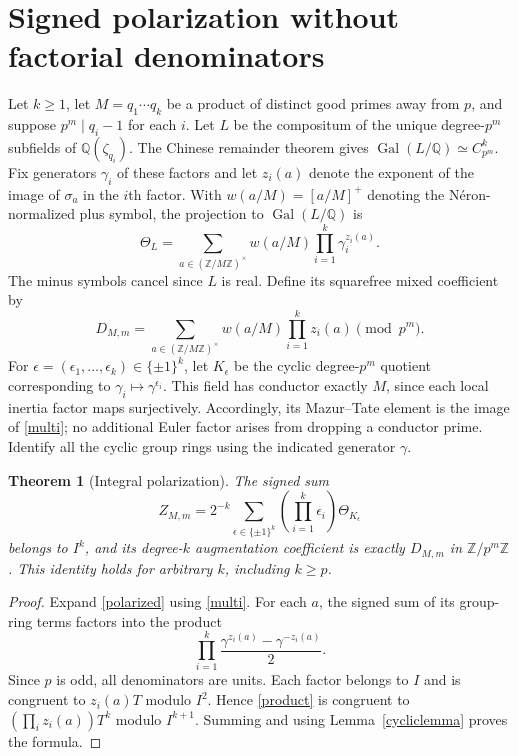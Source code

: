 \documentclass[11pt]{article}
\newtheorem{theorem}{Theorem}[section]
\theoremstyle{remark}\newtheorem{remark}[theorem]{Remark}
\newcommand{\Z}{\mathbb Z}\newcommand{\Q}{\mathbb Q}\newcommand{\F}{\mathbb F}
\newcommand{\Gal}{\operatorname{Gal}}
\begin{document}
\section{Signed polarization without factorial denominators}
Let $k\geq1$, let $M=q_1\cdots q_k$ be a product of distinct good primes away from $p$, and suppose $p^m\mid q_i-1$ for each $i$. Let $L$ be the compositum of the unique degree-$p^m$ subfields of $\Q(\zeta_{q_i})$. The Chinese remainder theorem gives $\Gal(L/\Q)\simeq C_{p^m}^k$. Fix generators $\gamma_i$ of these factors and let $z_i(a)$ denote the exponent of the image of $\sigma_a$ in the $i$th factor. With $w(a/M)=[a/M]^+$ denoting the N\'eron-normalized plus symbol, the projection to $\Gal(L/\Q)$ is
\begin{equation}
 \Theta_L=\sum_{a\in(\Z/M\Z)^\times}w(a/M)\prod_{i=1}^k\gamma_i^{z_i(a)}.\label{multi}
\end{equation}
The minus symbols cancel since $L$ is real. Define its squarefree mixed coefficient by
\begin{equation}
 D_{M,m}=\sum_{a\in(\Z/M\Z)^\times}w(a/M)\prod_{i=1}^kz_i(a)
 \pmod{p^m}.\label{mixed}
\end{equation}
For $\epsilon=(\epsilon_1,\ldots,\epsilon_k)\in\{\pm1\}^k$, let $K_\epsilon$ be the cyclic degree-$p^m$ quotient corresponding to $\gamma_i\mapsto\gamma^{\epsilon_i}$. This field has conductor exactly $M$, since each local inertia factor maps surjectively. Accordingly, its Mazur--Tate element is the image of \eqref{multi}; no additional Euler factor arises from dropping a conductor prime. Identify all the cyclic group rings using the indicated generator $\gamma$.

\begin{theorem}[Integral polarization]\label{polar}
The signed sum
\begin{equation}
 Z_{M,m}=2^{-k}\sum_{\epsilon\in\{\pm1\}^k}
 \left(\prod_{i=1}^k\epsilon_i\right)\Theta_{K_\epsilon}
 \label{polarized}
\end{equation}
belongs to $I^k$, and its degree-$k$ augmentation coefficient is exactly $D_{M,m}$ in $\Z/p^m\Z$. This identity holds for arbitrary $k$, including $k\geq p$.
\end{theorem}
\begin{proof}
Expand \eqref{polarized} using \eqref{multi}. For each $a$, the signed sum of its group-ring terms factors into the product
\begin{equation}
 \prod_{i=1}^k\frac{\gamma^{z_i(a)}-\gamma^{-z_i(a)}}2.\label{product}
\end{equation}
Since $p$ is odd, all denominators are units. Each factor belongs to $I$ and is congruent to $z_i(a)T$ modulo $I^2$. Hence \eqref{product} is congruent to $(\prod_i z_i(a))T^k$ modulo $I^{k+1}$. Summing and using Lemma~\ref{cycliclemma} proves the formula.
\end{proof}
\end{document}
